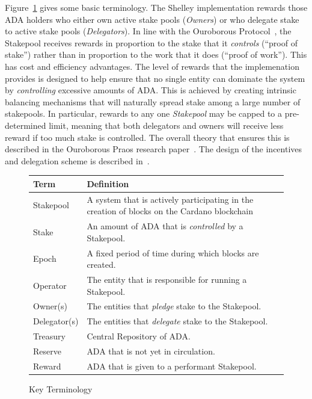 \documentclass[11pt,a4paper,dvipsnames,twosided]{article}
\newcommand{\ada}{ADA{}}
\newcommand{\cardano}[1]{Cardano}
\begin{document}
Figure~\ref{fig:terminology} gives some basic terminology.
The Shelley implementation rewards those \ada{} holders who either own active stake pools
(\emph{Owners}) or who delegate stake to active stake pools (\emph{Delegators}).
In line with the Ouroborous Protocol~\cite{ouroborous}, the Stakepool receives
rewards in proportion to the stake that it \emph{controls} (``proof of
stake'') rather than in proportion to the work that it does (``proof of work'').
This has cost and efficiency advantages.
The level of rewards that the implemenation provides is designed to help ensure that no single entity can
dominate the system by \emph{controlling} excessive amounts of \ada{}.  This is achieved by creating intrinsic
balancing mechanisms that will naturally spread stake among a large number of stakepools.
In particular, rewards to any one \emph{Stakepool} may be capped to a pre-determined limit,
meaning that both delegators and owners will receive less reward if too much stake is controlled.
The overall theory that ensures this is described in the Ouroborous Praos research
paper~\cite{OP}. The design of the incentives and delegation scheme is described
in~\cite{shelley_}.

\begin{figure}[t]
  \begin{center}
\begin{tabular}{||l|l||}
  \hline \hline
\textbf{Term} & \textbf{Definition} \\\hline
  Stakepool & A system that is actively participating in the creation of blocks on the \cardano{} blockchain  \\\hline
  Stake & An amount of \ada{} that is \emph{controlled} by a Stakepool.\\\hline
  Epoch & A fixed period of time during which blocks are created.\\\hline
Operator & The entity that is responsible for running a Stakepool. \\\hline
Owner(s) & The entities that \emph{pledge} stake to the Stakepool. \\\hline
  Delegator(s) & The entities that \emph{delegate} stake to the Stakepool.\\\hline
  Treasury & Central Repository of \ada.\\\hline
  Reserve & \ada{} that is not yet in circulation.\\\hline
  Reward & \ada{} that is given to a performant Stakepool.\\\hline
  \hline
\end{tabular}
\end{center}
\caption{Key Terminology}
\label{fig:terminology}
\end{figure}
\end{document}
